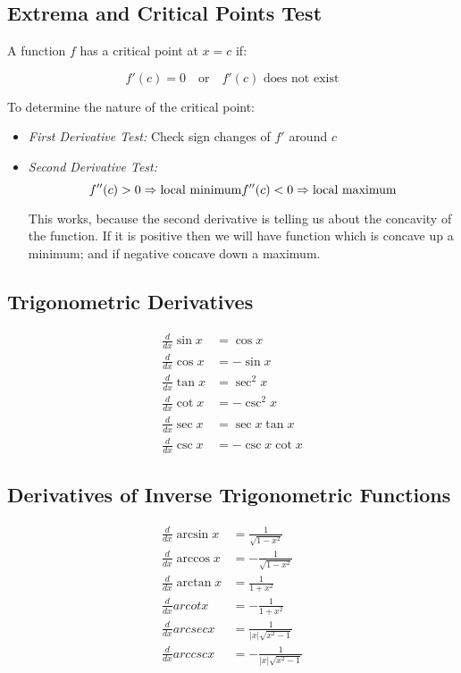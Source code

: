\subsection{Extrema and Critical Points Test}

A function \(f\) has a critical point at \(x = c\) if:

\[
    f'(c) = 0 \quad \text{or} \quad f'(c) \text{ does not exist}
\]

To determine the nature of the critical point:

\begin{itemize}

    \item \emph{First Derivative Test:} Check sign changes of \(f'\) around \(c\)

    \item \emph{Second Derivative Test:}
    \[
        f''(c) > 0 \Rightarrow \text{local minimum} \\
        f''(c) < 0 \Rightarrow \text{local maximum}
    \]

    This works, because the second derivative is telling us about the concavity of the function. If it is 
    positive then we will have function which is concave up a minimum; and if negative concave down a maximum. 

\end{itemize}

\subsection{Trigonometric Derivatives}

\begin{align*}
    \frac{d}{dx} \sin x &= \cos x \\
    \frac{d}{dx} \cos x &= -\sin x \\
    \frac{d}{dx} \tan x &= \sec^2 x \\
    \frac{d}{dx} \cot x &= -\csc^2 x \\
    \frac{d}{dx} \sec x &= \sec x \tan x \\
    \frac{d}{dx} \csc x &= -\csc x \cot x
\end{align*}

\subsection{Derivatives of Inverse Trigonometric Functions}

\begin{align*}
    \frac{d}{dx} \arcsin x &= \frac{1}{\sqrt{1 - x^2}} \\
    \frac{d}{dx} \arccos x &= -\frac{1}{\sqrt{1 - x^2}} \\
    \frac{d}{dx} \arctan x &= \frac{1}{1 + x^2} \\
    \frac{d}{dx} arcot x &= -\frac{1}{1 + x^2} \\
    \frac{d}{dx} arcsec x &= \frac{1}{|x|\sqrt{x^2 - 1}} \\
    \frac{d}{dx} arccsc x &= -\frac{1}{|x|\sqrt{x^2 - 1}}
\end{align*}

